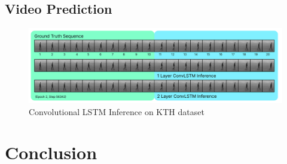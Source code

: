 \documentclass{scrartcl}
\begin{document}

\subsection{Video Prediction}
\label{subsec:experiment_vp}

\begin{figure}[H]
	\begin{center}
		\includegraphics[width=1\textwidth]{images/kth/KTHEpoch2Step56342.png}
	\end{center}
	\caption{Convolutional LSTM Inference on KTH dataset}
	\label{img:lstm_kth_inference}
\end{figure}

\newpage
\section{Conclusion}
\label{sec:conclusion}


\newpage

\newpage
\end{document}
